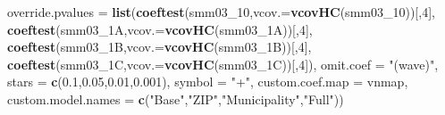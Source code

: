 \documentclass[
]{article}
\newenvironment{Shaded}{\begin{snugshade}}{\end{snugshade}}
\newcommand{\DataTypeTok}[1]{\textcolor[rgb]{0.13,0.29,0.53}{#1}}
\newcommand{\DecValTok}[1]{\textcolor[rgb]{0.00,0.00,0.81}{#1}}
\newcommand{\FloatTok}[1]{\textcolor[rgb]{0.00,0.00,0.81}{#1}}
\newcommand{\KeywordTok}[1]{\textcolor[rgb]{0.13,0.29,0.53}{\textbf{#1}}}
\newcommand{\NormalTok}[1]{#1}
\newcommand{\StringTok}[1]{\textcolor[rgb]{0.31,0.60,0.02}{#1}}
\begin{document}
\begin{Shaded}
\begin{Highlighting}[]
          \DataTypeTok{override.pvalues =} \KeywordTok{list}\NormalTok{(}\KeywordTok{coeftest}\NormalTok{(smm03_}\DecValTok{10}\NormalTok{,}\DataTypeTok{vcov.=}\KeywordTok{vcovHC}\NormalTok{(smm03_}\DecValTok{10}\NormalTok{))[,}\DecValTok{4}\NormalTok{],}
                                  \KeywordTok{coeftest}\NormalTok{(smm03_1A,}\DataTypeTok{vcov.=}\KeywordTok{vcovHC}\NormalTok{(smm03_1A))[,}\DecValTok{4}\NormalTok{],}
                                  \KeywordTok{coeftest}\NormalTok{(smm03_1B,}\DataTypeTok{vcov.=}\KeywordTok{vcovHC}\NormalTok{(smm03_1B))[,}\DecValTok{4}\NormalTok{],}
                                  \KeywordTok{coeftest}\NormalTok{(smm03_1C,}\DataTypeTok{vcov.=}\KeywordTok{vcovHC}\NormalTok{(smm03_1C))[,}\DecValTok{4}\NormalTok{]),}
          \DataTypeTok{omit.coef =} \StringTok{"(wave)"}\NormalTok{, }\DataTypeTok{stars =} \KeywordTok{c}\NormalTok{(}\FloatTok{0.1}\NormalTok{,}\FloatTok{0.05}\NormalTok{,}\FloatTok{0.01}\NormalTok{,}\FloatTok{0.001}\NormalTok{), }\DataTypeTok{symbol =} \StringTok{"+"}\NormalTok{,}
          \DataTypeTok{custom.coef.map =}\NormalTok{ vnmap, }
          \DataTypeTok{custom.model.names =} \KeywordTok{c}\NormalTok{(}\StringTok{"Base"}\NormalTok{,}\StringTok{"ZIP"}\NormalTok{,}\StringTok{"Municipality"}\NormalTok{,}\StringTok{"Full"}\NormalTok{))}
\end{Highlighting}
\end{Shaded}
\end{document}
